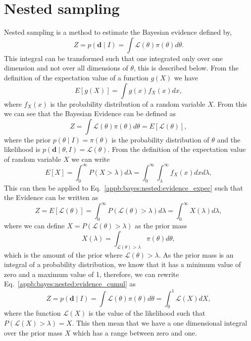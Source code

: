 \chapter{\label{appb} Nested sampling}

Nested sampling is a method to estimate the Bayesian evidence defined by,
\begin{equation}
\label{appb:bayes:evidence}
Z = p(\bm{d} \mid I) = \int \mathcal{L}(\theta) \pi(\theta) d\theta.
\end{equation}
This integral can be transformed such that one integrated only over one dimension and not over all dimensions of $\theta$, this is described below.
From the definition of the expectation value of a function $g(X)$ we
have
\begin{equation}
  \label{appb:bayes:nested:exectationg}
  E[ g(X) ] = \int g(x) f_X(x) dx,
\end{equation}
where $f_X(x)$ is the probability distribution of a random variable
$X$.
From this we can see that the Bayesian Evidence can be defined as
\begin{equation}
  \label{appb:bayes:nested:evidence_expec}
  Z = \int \mathcal{L}(\theta) \pi(\theta) d\theta
  = E [ \mathcal{L}(\theta)],
\end{equation}
where the prior $p(\theta \mid I) = \pi(\theta)$ is the probability
distribution of $\theta$ and the likelihood is $p(\bm{d} \mid \theta,
I) = \mathcal{L}(\theta)$.
From the definition of the expectation value of random variable $X$ we
can write
\begin{equation}
  \label{appb:bayes:nested:exectationx}
  E[X] = \int_0^{\infty} P(X > \lambda) d\lambda = \int_0^{\infty}
  \int_{\lambda}^{\infty} f_X(x) dx d\lambda,
\end{equation}
This can then be applied to
Eq.~\ref{appb:bayes:nested:evidence_expec} such that the Evidence
can be written as
\begin{equation}
  \label{appb:bayes:nested:evidence_cumul}
  Z = E[\mathcal{L}(\theta)] = \int_0^{\infty}  P(\mathcal{L}(\theta)
  > \lambda) d\lambda = \int_0^{\infty}  X(\lambda) d\lambda ,
\end{equation}
where we can define $X = P(\mathcal{L}(\theta) > \lambda)$ as the
prior mass
\begin{equation}
  \label{appb:bayes:nested:priormass}
  X(\lambda) = \int_{\mathcal{L}(\theta) > \lambda} \pi(\theta)
  d\theta,
\end{equation}
which is the amount of the prior where $\mathcal{L}(\theta) >
\lambda$.
As the prior mass is an integral of a probability distribution, we
know that it has a minimum value of zero and a maximum value of 1,
therefore, we can rewrite
Eq.~\ref{appb:bayes:nested:evidence_cumul} as
\begin{equation}
  \label{appb:bayes:nested:evidence}
  Z = p(\bm{d} \mid I) = \int \mathcal{L}(\theta) \pi(\theta) d\theta
  = \int_0^1 \mathcal{L}(X) dX,
\end{equation}
where the function $\mathcal{L}(X)$ is the value of the likelihood
such that $P(\mathcal{L}(X) > \lambda) = X$.
This then mean that we have a one dimensional integral over the prior
mass $X$ which has a range between zero and one.